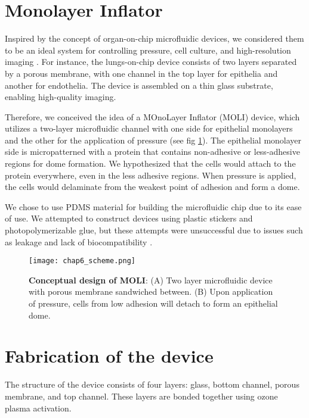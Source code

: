 \hypertarget{monolayer-inflator}{%
\section{Monolayer Inflator}\label{monolayer-inflator}}

Inspired by the concept of organ-on-chip microfluidic devices, we considered them to be an ideal system for controlling pressure, cell culture, and high-resolution imaging \cite{huh2010, nelson2017}. For instance, the lungs-on-chip device consists of two layers separated by a porous membrane, with one channel in the top layer for epithelia and another for endothelia. The device is assembled on a thin glass substrate, enabling high-quality imaging.  

Therefore, we conceived the idea of a MOnoLayer Inflator (MOLI) device, which utilizes a two-layer microfluidic channel with one side for epithelial monolayers and the other for the application of pressure (see fig \ref{fig_6_1}). The epithelial monolayer side is micropatterned with a protein that contains non-adhesive or less-adhesive regions for dome formation. We hypothesized that the cells would attach to the protein everywhere, even in the less adhesive regions. When pressure is applied, the cells would delaminate from the weakest point of adhesion and form a dome.  

We chose to use PDMS material for building the microfluidic chip due to its ease of use. We attempted to construct devices using plastic stickers and photopolymerizable glue, but these attempts were unsuccessful due to issues such as leakage and lack of biocompatibility \cite{sollier2011, bartolo2008}.  

\begin{figure}[h]
	\centering
	\texttt{[image: chap6\_scheme.png]}
	\caption{\textbf{Conceptual design of MOLI}: (A) Two layer microfluidic device with porous membrane sandwiched between. (B) Upon application of pressure, cells from low adhesion will detach to form an epithelial dome.
	}\label{fig_6_1}
\end{figure}


\hypertarget{fabrication-of-the-device}{%
\section{Fabrication of the device}\label{fabrication-of-the-device}}

The structure of the device consists of four layers: glass, bottom channel, porous membrane, and top channel. These layers are bonded together using ozone plasma activation.  

